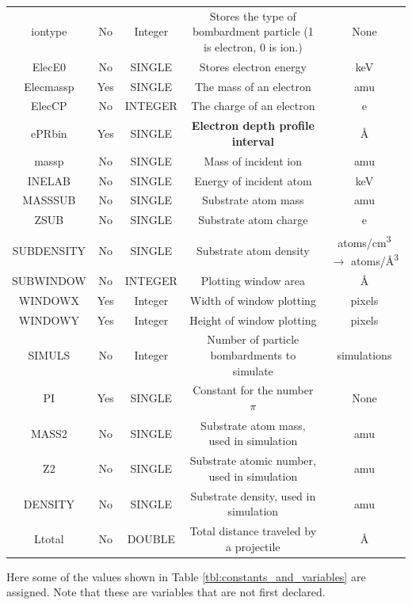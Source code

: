 \documentclass[10pt, reqno]{exam}
\begin{document}
{\begin{longtable}{|c|c|c|c|c|}
        iontype & No & Integer & Stores the type of bombardment particle (1 is electron, 0 is ion.) & None \\
        ElecE0 & No & SINGLE & Stores electron energy & keV \\
        Elecmassp & Yes & SINGLE & The mass of an electron & amu \\
        ElecCP & No & INTEGER & The charge of an electron & e \\
        ePRbin & Yes & SINGLE & \textbf{Electron depth profile interval} & \si{\angstrom} \\
        massp & No & SINGLE & Mass of incident ion & amu \\
        INELAB & No & SINGLE & Energy of incident atom & keV \\
        MASSSUB & No & SINGLE & Substrate atom mass & amu \\
        ZSUB & No & SINGLE & Substrate atom charge & e \\
        SUBDENSITY & No & SINGLE & Substrate atom density & \si{atoms/cm^3} $\rightarrow$ \si{atoms/\angstrom^3} \\
        SUBWINDOW & No & INTEGER & Plotting window area & \si{\angstrom} \\
        WINDOWX & Yes & Integer & Width of window plotting & pixels \\
        WINDOWY & Yes & Integer & Height of window plotting & pixels \\
        SIMULS & No & Integer & Number of particle bombardments to simulate & simulations \\
        PI & Yes & SINGLE & Constant for the number $\pi$ & None \\
        \hline
        MASS2 & No & SINGLE & Substrate atom mass, used in simulation & amu \\
        Z2 & No & SINGLE & Substrate atomic number, used in simulation & amu \\
        DENSITY & No & SINGLE & Substrate density, used in simulation & amu \\
        Ltotal & No & DOUBLE & Total distance traveled by a projectile & \si{\angstrom} \\
        \hline
    \end{longtable}
}
\pagebreak

Here some of the values shown in Table \ref{tbl:constants_and_variables} are assigned. Note that these are variables that are not first declared. \par
\end{document}
